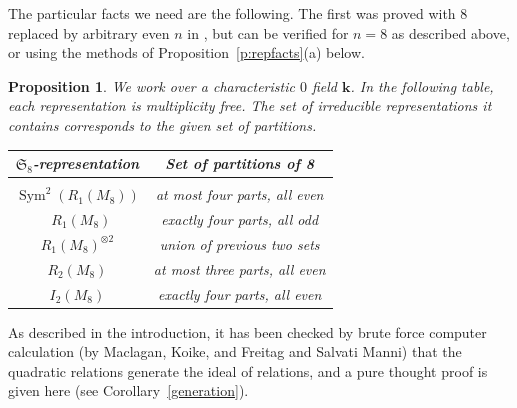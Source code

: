 \documentclass{amsart}
\newtheorem{proposition}[theorem]{Proposition}
\theoremstyle{definition}
\theoremstyle{remark}
\DeclareMathOperator{\Sym}{Sym}
\DeclareMathOperator{\bw}{{\bigwedge}^{\! 2}}
\def\SS{\mathfrak{S}}
\def\fieldk{\mathbf{k}}
\begin{document}
The particular facts we  need are the following.  The first was proved with $8$ replaced by arbitrary even $n$ in
\cite[Prop.~6.5]{hmsv2}, but can be verified for $n=8$ as described above, or using the methods of
Proposition~\ref{p:repfacts}(a) below.

\begin{proposition}
\label{prop:decomp}
We work over a characteristic $0$ field $\fieldk$.  In the following table, each representation is multiplicity free.
The set of irreducible representations it contains corresponds to the given set of partitions.
\begin{center}
\rm
\begin{tabular}{c|c}
$\SS_8$-representation & Set of partitions of 8 \\[.5ex]
\hline \\[-2ex]
$\Sym^2(R_1(M_8))$ & at most four parts, all even \\[1ex]
$\bw{R_1(M_8)}$ & exactly four parts, all odd \\[1ex]
$R_1(M_8)^{\otimes 2}$ & union of previous two sets \\[1ex]
$R_2(M_8)$ & at most three parts, all even \\[1ex]
$I_2(M_8)$ & exactly four parts, all even
\end{tabular}\end{center}
\end{proposition}

As described in the introduction, it has been checked by brute force computer calculation (by Maclagan, Koike, and
Freitag and Salvati Manni) that the quadratic relations generate the ideal of relations, and a pure thought proof is
given here (see Corollary~\ref{generation}).
\end{document}
